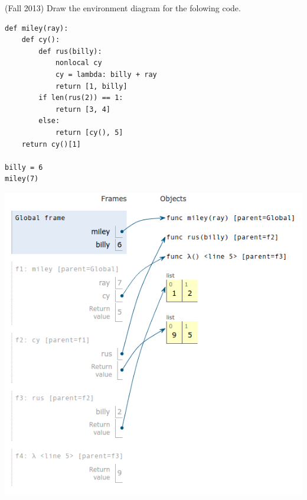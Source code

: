 \question (Fall 2013) Draw the environment diagram for the folowing code.

\begin{minipage}{\textwidth}
\begin{lstlisting}
def miley(ray):
    def cy():
        def rus(billy):
            nonlocal cy
            cy = lambda: billy + ray
            return [1, billy]
        if len(rus(2)) == 1:
            return [3, 4]
        else:
            return [cy(), 5]
    return cy()[1]

billy = 6
miley(7)

\end{lstlisting}
\end{minipage}

\begin{solution}[0.5in]
\begin{center}
\includegraphics[scale=.5]{cyrus.png}
\end{center}
\end{solution}
